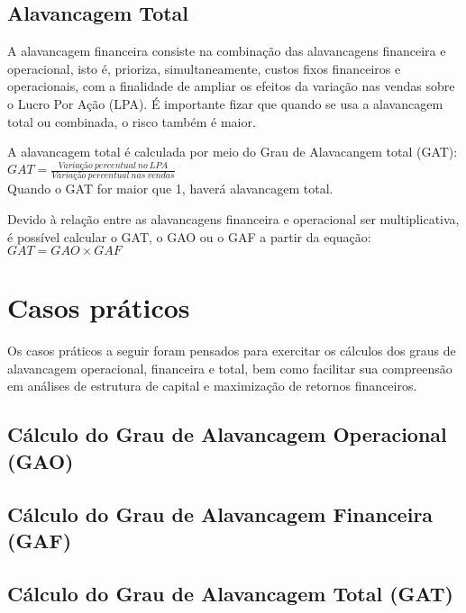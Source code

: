 \documentclass[a4paper,12pt]{article}
\begin{document}
\subsection{Alavancagem Total}

A alavancagem financeira consiste na combinação das alavancagens financeira e operacional, isto é, prioriza, simultaneamente, custos fixos financeiros e operacionais, com a finalidade de ampliar os efeitos da variação nas vendas sobre o Lucro Por Ação (LPA). É importante fizar que quando se usa a alavancagem total ou combinada, o risco também é maior. 

A alavancagem total é calculada por meio do Grau de Alavacangem total (GAT):\\

$GAT= \frac{Variação \ percentual \ no \ LPA}{Variação \ percentual \ nas \ vendas}$\\

Quando o GAT for maior que 1, haverá alavancagem total.

Devido à relação entre as alavancagens financeira e operacional ser multiplicativa, é possível calcular o GAT, o GAO ou o GAF a partir da equação:\\

$GAT= GAO \times GAF$


\section{Casos práticos}

Os casos práticos a seguir foram pensados para exercitar os cálculos dos graus de alavancagem operacional, financeira e total, bem como facilitar sua compreensão em análises de estrutura de capital e maximização de retornos financeiros.

\subsection{Cálculo do Grau de Alavancagem Operacional (GAO)}


\subsection{Cálculo do Grau de Alavancagem Financeira (GAF)}




\subsection{Cálculo do Grau de Alavancagem Total (GAT)}
\end{document}

